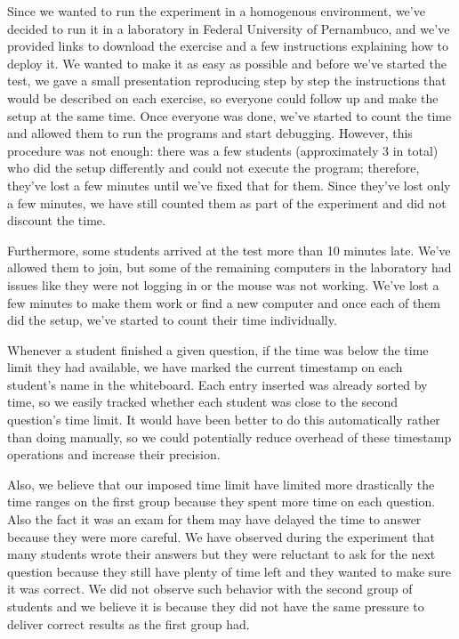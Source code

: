 Since we wanted to run the experiment in a homogenous environment, we've decided to run it in a laboratory in Federal University of Pernambuco, and we've provided links to download the exercise and a few instructions explaining how to deploy it. We wanted to make it as easy as possible and before we've started the test, we gave a small presentation reproducing step by step the instructions that would be described on each exercise, so everyone could follow up and make the setup at the same time. Once everyone was done, we've started to count the time and allowed them to run the programs and start debugging. However, this procedure was not enough: there was a few students (approximately 3 in total) who did the setup differently and could not execute the program; therefore, they've lost a few minutes until we've fixed that for them. Since they've lost only a few minutes, we have still counted them as part of the experiment and did not discount the time.

Furthermore, some students arrived at the test more than 10 minutes late. We've allowed them to join, but some of the remaining computers in the laboratory had issues like they were not logging in or the mouse was not working. We've lost a few minutes to make them work or find a new computer and once each of them did the setup, we've started to count their time individually.

Whenever a student finished a given question, if the time was below the time limit they had available, we have marked the current timestamp on each student's name in the whiteboard. Each entry inserted was already sorted by time, so we easily tracked whether each student was close to the second question's time limit. It would have been better to do this automatically rather than doing manually, so we could potentially reduce overhead of these timestamp operations and increase their precision.

Also, we believe that our imposed time limit have limited more drastically the time ranges on the first group because they spent more time on each question. Also the fact it was an exam for them may have delayed the time to answer because they were more careful. We have observed during the experiment that many students wrote their answers but they were reluctant to ask for the next question because they still have plenty of time left and they wanted to make sure it was correct. We did not observe such behavior with the second group of students and we believe it is because they did not have the same pressure to deliver correct results as the first group had.

